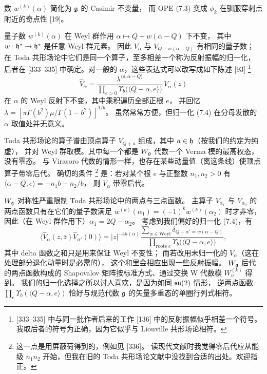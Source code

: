 
数 $w^{(k)}(\alpha)$ 简化为 $\mathfrak{g}$ 的 Casimir 不变量，
而 OPE (7.3) 变成 $\phi_k$ 在驯服穿刺点附近的奇点性 [19]。

量子数 $w^{(k)}(\alpha)$ 在 Weyl 群作用 $\alpha\mapsto Q+w(\alpha-Q)$ 下不变，
其中 $w:\mathfrak{h}^*\to\mathfrak{h}^*$ 是任意 Weyl 群元素。
因此 $V_\alpha$ 与 $V_{Q+w(\alpha-Q)}$ 有相同的量子数；
在 Toda 共形场论中它们是同一个算子，至多相差一个称为反射振幅的归一化，
后者在 [333--335] 中确定。对一般的 $\alpha$，这些表达式可以改写成如下陈述 [93]
\footnote{[333--335] 中与同一批作者后来的工作 [136] 中的反射振幅似乎相差一个符号。
我取后者的符号为正确，因为它似乎与 Liouville 共形场论相符。}
\begin{equation}
\widehat{V}_\alpha
=\frac{\lambda^{\langle\rho,\alpha-Q\rangle}}
{\prod_{e>0}\Upsilon_b\big(\langle Q-\alpha,e\rangle\big)}\,V_\alpha(z)
\tag{7.4}
\end{equation}
在 $\alpha$ 的 Weyl 反射下不变，其中乘积遍历全部正根 $e$，
并回忆 $\lambda=[\pi\Gamma(b^2)\mu/\Gamma(1-b^2)]^{1/b}$。
虽然常常方便，但归一化 (7.4) 在分母发散的 $\alpha$ 取值处并无意义。

Toda 共形场论的算子谱由顶点算子 $V_{Q+a}$ 组成，其中 $a\in\mathfrak{h}$（按我们的约定为纯虚），
并对 Weyl 群取模。其中每一个都是 $W_{\mathfrak{g}}$ 代数一个 Verma 模的最高权态，没有零态。
与 Virasoro 代数的情形一样，也存在某些动量值（离这条线）使顶点算子带零后代。
确切的条件
\footnote{这一点是用屏蔽荷得到的，例如见 [336]。
读现代文献时我觉得零后代应从能级 $n_1n_2$ 开始，但我在旧的 Toda 共形场论文献中没找到合适的出处。欢迎指正。}
是：若对某个根 $e$ 与正整数 $n_1,n_2>0$ 有 $\langle\alpha-Q,e\rangle=-n_1b-n_2/b$，
则 $V_\alpha$ 带零后代。

$W_{\mathfrak{g}}$ 对称性严重限制 Toda 共形场论中的两点与三点函数。
主算子 $V_{\alpha_1}$ 与 $V_{\alpha_2}$ 的两点函数只有在它们的量子数满足
$w^{(k)}(\alpha_1)=(-1)^kw^{(k)}(\alpha_2)$ 时才非零，
因此（在 Weyl 群作用下）$\alpha_1=2Q-\alpha_2$。
考虑到我们偏好的归一化 (7.4)，有
\begin{equation}
\langle\widehat{V}_\alpha(z,\bar z)\widehat{V}_{\alpha'}(0)\rangle
=|z|^{-4h(\alpha)}
\frac{\sum_{w\in\mathrm{Weyl}}\delta_{Q-\alpha'=w(\alpha-Q)}}
{\prod_{\text{roots }e}\Upsilon_b\big(\langle Q-\alpha,e\rangle\big)},
\tag{7.5}
\end{equation}
其中 delta 函数之和只是用来保证 Weyl 不变性；
而若改用未归一化的 $V_\alpha$（这在处理部分退化动量时是必需的），
这个和里会相应出现一些反射振幅。
$W_{\mathfrak{g}}$ 后代的两点函数构成的 Shapovalov 矩阵按标准方式、通过交换 W 代数模 $W^{(k)}_n$ 得到。
我们的归一化选择之所以讨人喜欢，是因为如同 $\mathfrak{su}(2)$ 情形，
逆两点函数 $\prod_e\Upsilon_b(\langle Q-\alpha,e\rangle)$
恰好与规范代数 $\mathfrak{g}$ 的矢量多重态的单圈行列式相符。

